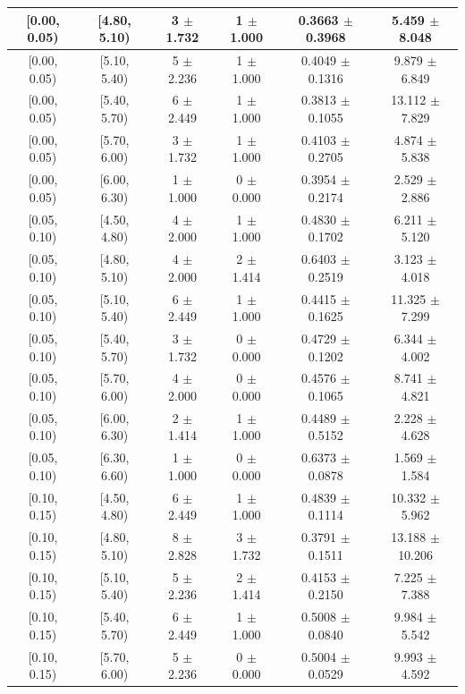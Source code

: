 \begin{longtable}{|c|c|c|c|c|c|}
\hline
\endlastfoot
[0.00, 0.05) & [4.80, 5.10) & 3 $\pm$ 1.732 & 1 $\pm$ 1.000 & 0.3663 $\pm$ 0.3968 & 5.459 $\pm$ 8.048 \\ 
\hline
[0.00, 0.05) & [5.10, 5.40) & 5 $\pm$ 2.236 & 1 $\pm$ 1.000 & 0.4049 $\pm$ 0.1316 & 9.879 $\pm$ 6.849 \\ 
\hline
[0.00, 0.05) & [5.40, 5.70) & 6 $\pm$ 2.449 & 1 $\pm$ 1.000 & 0.3813 $\pm$ 0.1055 & 13.112 $\pm$ 7.829 \\ 
\hline
[0.00, 0.05) & [5.70, 6.00) & 3 $\pm$ 1.732 & 1 $\pm$ 1.000 & 0.4103 $\pm$ 0.2705 & 4.874 $\pm$ 5.838 \\ 
\hline
[0.00, 0.05) & [6.00, 6.30) & 1 $\pm$ 1.000 & 0 $\pm$ 0.000 & 0.3954 $\pm$ 0.2174 & 2.529 $\pm$ 2.886 \\ 
\hline
[0.05, 0.10) & [4.50, 4.80) & 4 $\pm$ 2.000 & 1 $\pm$ 1.000 & 0.4830 $\pm$ 0.1702 & 6.211 $\pm$ 5.120 \\ 
\hline
[0.05, 0.10) & [4.80, 5.10) & 4 $\pm$ 2.000 & 2 $\pm$ 1.414 & 0.6403 $\pm$ 0.2519 & 3.123 $\pm$ 4.018 \\ 
\hline
[0.05, 0.10) & [5.10, 5.40) & 6 $\pm$ 2.449 & 1 $\pm$ 1.000 & 0.4415 $\pm$ 0.1625 & 11.325 $\pm$ 7.299 \\ 
\hline
[0.05, 0.10) & [5.40, 5.70) & 3 $\pm$ 1.732 & 0 $\pm$ 0.000 & 0.4729 $\pm$ 0.1202 & 6.344 $\pm$ 4.002 \\ 
\hline
[0.05, 0.10) & [5.70, 6.00) & 4 $\pm$ 2.000 & 0 $\pm$ 0.000 & 0.4576 $\pm$ 0.1065 & 8.741 $\pm$ 4.821 \\ 
\hline
[0.05, 0.10) & [6.00, 6.30) & 2 $\pm$ 1.414 & 1 $\pm$ 1.000 & 0.4489 $\pm$ 0.5152 & 2.228 $\pm$ 4.628 \\ 
\hline
[0.05, 0.10) & [6.30, 6.60) & 1 $\pm$ 1.000 & 0 $\pm$ 0.000 & 0.6373 $\pm$ 0.0878 & 1.569 $\pm$ 1.584 \\ 
\hline
[0.10, 0.15) & [4.50, 4.80) & 6 $\pm$ 2.449 & 1 $\pm$ 1.000 & 0.4839 $\pm$ 0.1114 & 10.332 $\pm$ 5.962 \\ 
\hline
[0.10, 0.15) & [4.80, 5.10) & 8 $\pm$ 2.828 & 3 $\pm$ 1.732 & 0.3791 $\pm$ 0.1511 & 13.188 $\pm$ 10.206 \\ 
\hline
[0.10, 0.15) & [5.10, 5.40) & 5 $\pm$ 2.236 & 2 $\pm$ 1.414 & 0.4153 $\pm$ 0.2150 & 7.225 $\pm$ 7.388 \\ 
\hline
[0.10, 0.15) & [5.40, 5.70) & 6 $\pm$ 2.449 & 1 $\pm$ 1.000 & 0.5008 $\pm$ 0.0840 & 9.984 $\pm$ 5.542 \\ 
\hline
[0.10, 0.15) & [5.70, 6.00) & 5 $\pm$ 2.236 & 0 $\pm$ 0.000 & 0.5004 $\pm$ 0.0529 & 9.993 $\pm$ 4.592 \\ 

\end{longtable}
